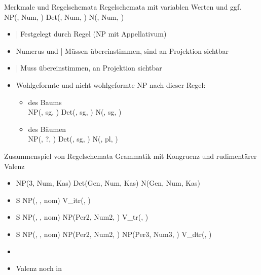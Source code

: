 \begin{frame}
  {Merkmale und Regelschemata}
  \onslide<+->
  \onslide<+->
  Regelschemata mit \alert{variablen Werten} und ggf.\ \\
  \onslide<+->
  \Zeile
  \centering 
  {\Large NP(, \alert{Num}, ) \goesto Det(, \alert{Num}, ) N(, \alert{Num}, ) }
  \Zeile
  \begin{itemize}[<+->]
    \item {} | Festgelegt durch Regel (NP mit Appellativum)
    \item \alert{Numerus} und  | Müssen übereinstimmen, sind an Projektion sichtbar
    \item {} | Muss übereinstimmen, an Projektion sichtbar
    \Zeile
    \item Wohlgeformte und nicht wohlgeformte NP nach dieser Regel:
      \Viertelzeile
      \begin{itemize}[<+->]
        \item des Baums \\
          NP(, \alert{sg}, ) \goesto Det(, \alert{sg}, ) N(, \alert{sg}, )
          \Viertelzeile
        \item des Bäumen \\
          NP(, \alert{?}, ) \goesto Det(, \alert{sg}, ) N(, \alert{pl}, )
      \end{itemize}
  \end{itemize}
\end{frame}


\begin{frame}
  {Zusammenspiel von Regelschemata}
  \onslide<+->
  \onslide<+->
  Grammatik mit Kongruenz und rudimentärer Valenz\\
  \Halbzeile
  \begin{itemize}[<+->]
    \item[ ] NP(3, Num, Kas) \goesto Det(Gen, Num, Kas) N(Gen, Num, Kas)
    \item[ ] S \goesto NP(, , \alert{nom}) V\_itr(, )
    \item[ ] S \goesto NP(, , \alert{nom}) NP(Per2, Num2, ) V\_tr(, )
    \item[ ] S \goesto NP(, , \alert{nom}) NP(Per2, Num2, ) NP(Per3, Num3, ) V\_dtr(, )
  \end{itemize}
  \Zeile
  \begin{itemize}[<+->]
    \item {}
    \item \alert{Valenz noch in}  
  \end{itemize}
\end{frame}


